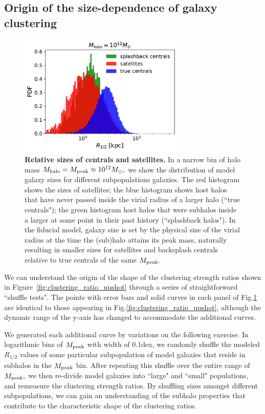 \documentclass[usenatbib,usegraphicx,letterpaper]{mn2e}
\newcommand{\rhalf}{R_{1/2}}
\newcommand{\mpeak}{M_{\rm peak}}
\newcommand{\mhalo}{M_{\rm halo}}
\newcommand{\msun}{M_\odot}
\begin{document}
\subsection{Origin of the size-dependence of galaxy clustering}
\label{subsec:shuffle_tests}

\begin{figure}
\centering
\includegraphics[width=8cm]{FIGS/cen_sat_sizes.pdf}
\caption{
{\bf Relative sizes of centrals and satellites.} In a narrow bin of halo mass $\mhalo=\mpeak\approx10^{12}\msun,$ we show the distribution of model galaxy sizes for different subpopulations galaxies. The red histogram shows the sizes of satellites; the blue histogram shows host halos that have never passed inside the virial radius of a larger halo (``true centrals"); the green histogram host halos that were subhalos inside a larger at some point in their past history (``splashback halos"). In the fiducial model, galaxy size is set by the physical size of the virial radius at the time the (sub)halo attains its peak mass, naturally resulting in smaller sizes for satellites and backsplash centrals relative to true centrals of the same $\mpeak.$
}
\label{fig:shuffle}
\end{figure}

We can understand the origin of the shape of the clustering strength ratios shown in Figure~\ref{fig:clustering_ratio_upshot} through a series of straightforward ``shuffle tests". The points with error bars and solid curves in each panel of Fig.\ref{fig:shuffle} are identical to those appearing in Fig.\ref{fig:clustering_ratio_upshot}, although the dynamic range of the y-axis has changed to accommodate the additional curves. 

We generated each additional curve by variations on the following exercise. In logarithmic bins of $\mpeak$ with width of $0.1$dex, we randomly shuffle the modeled $\rhalf$ values of some particular subpopulation of model galaxies that reside in subhalos in the $\mpeak$ bin. After repeating this shuffle over the entire range of $\mpeak,$ we then re-divide model galaxies into ``large" and ``small" populations, and remeasure the clustering strength ratios. By shuffling sizes amongst different subpopulations, we can gain an understanding of the subhalo properties that contribute to the characteristic shape of the clustering ratios. 
\end{document}
